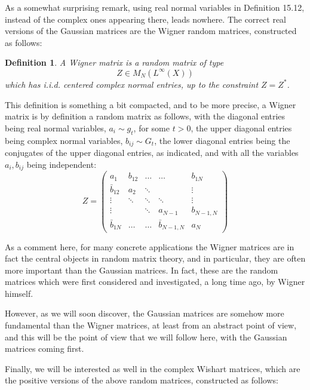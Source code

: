 \documentclass[12pt]{amsbook}
\newtheorem{definition}[theorem]{Definition}
\begin{document}
\bigskip

As a somewhat surprising remark, using real normal variables in Definition 15.12, instead of the complex ones appearing there, leads nowhere. The correct real versions of the Gaussian matrices are the Wigner random matrices, constructed as follows: 


\begin{definition}
A Wigner matrix is a random matrix of type
$$Z\in M_N(L^\infty(X))$$
which has i.i.d. centered complex normal entries, up to the constraint $Z=Z^*$.
\end{definition}

This definition is something a bit compacted, and to be more precise, a Wigner matrix is by definition a random matrix as follows, with the diagonal entries being real normal variables, $a_i\sim g_t$, for some $t>0$, the upper diagonal entries being complex normal variables, $b_{ij}\sim G_t$, the lower diagonal entries being the conjugates of the upper diagonal entries, as indicated, and with all the variables $a_i,b_{ij}$ being independent: 
$$Z=\begin{pmatrix}
a_1&b_{12}&\ldots&\ldots&b_{1N}\\
\bar{b}_{12}&a_2&\ddots&&\vdots\\
\vdots&\ddots&\ddots&\ddots&\vdots\\
\vdots&&\ddots&a_{N-1}&b_{N-1,N}\\
\bar{b}_{1N}&\ldots&\ldots&\bar{b}_{N-1,N}&a_N
\end{pmatrix}$$

As a comment here, for many concrete applications the Wigner matrices are in fact the central objects in random matrix theory, and in particular, they are often more important than the Gaussian matrices. In fact, these are the random matrices which were first considered and investigated, a long time ago, by Wigner himself.

\bigskip

However, as we will soon discover, the Gaussian matrices are somehow more fundamental than the Wigner matrices, at least from an abstract point of view, and this will be the point of view that we will follow here, with the Gaussian matrices coming first.

\bigskip

Finally, we will be interested as well in the complex Wishart matrices, which are the positive versions of the above random matrices, constructed as follows: 
\end{document}
